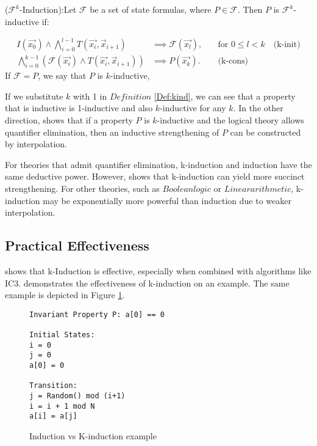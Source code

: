 \begin{minipage}{\textwidth}
\begin{definition}
($\mathcal{F}^k$-Induction\cite{7886665}):Let $\mathcal{F}$ be a set of state formulas, where $P \in \mathcal{F}$. Then \( P \) is $\mathcal{F}^k$-inductive if:

\begin{align*}
    I(\vec{x_0}) \land \bigwedge_{i = 0}^{l - 1}T(\vec{x_i}, \vec{x}_{i+1})
    &\implies \mathcal{F}(\vec{x_l}), \quad &\text{for } 0 \leq l < k \quad \text{(k-init)} \\
    \bigwedge_{i = 0}^{k - 1}(\mathcal{F}(\vec{x_i}) \land T(\vec{x_i}, \vec{x}_{i+1}))
    &\implies P(\vec{x_k}). \quad &\text{(k-cons)}
\end{align*}
If $\mathcal{F} = {P}$, we say that \( P \) is \( k \)-inductive,
\label{Def:kind}
\end{definition}
\end{minipage}
If we substitute \( k \) with 1 in \( Definition \) \ref{Def:kind}, we can see that a property that is inductive is 1-inductive and also \( k \)-inductive for any \( k \). In the other direction, \cite{10.1007/978-3-319-08867-9_55} shows that if a property \( P \) is \( k \)-inductive and the logical theory allows quantifier elimination, then an inductive strengthening of \( P \) can be constructed by interpolation.

For theories that admit quantifier elimination, k-induction and induction have the same deductive power. However, \cite{Bjørner2015} shows that k-induction can yield more succinct strengthening. For other theories, such as \( Boolean logic \) or \( Linear arithmetic \), k-induction may be exponentially more powerful than induction due to weaker interpolation.

\subsection*{Practical Effectiveness}
\noindent \cite{7886665} shows that k-Induction is effective, especially when combined with algorithms like IC3.
\cite{7886665} demonstrates the effectiveness of k-induction on an example. The same example is depicted in Figure \ref{ex:ind vs kind}.

\begin{figure}[h]
    \begin{mdframed}
        \begin{lstlisting}
Invariant Property P: a[0] == 0

Initial States:
i = 0
j = 0
a[0] = 0

Transition:
j = Random() mod (i+1)
i = i + 1 mod N
a[i] = a[j]
        \end{lstlisting}
        \caption{Induction vs K-induction example}\label{ex:ind vs kind}
    \end{mdframed}
\end{figure}

